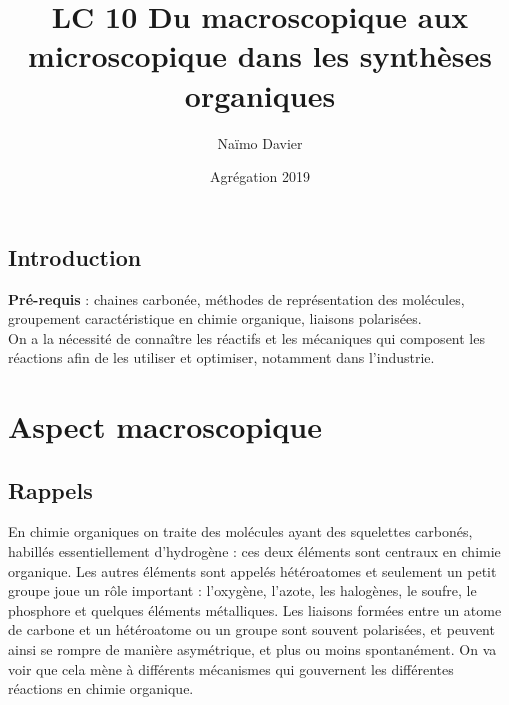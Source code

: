 \documentclass[12pt,prb,aps,epsf]{article}
\begin{document}
	
	\title{LC 10 Du macroscopique aux microscopique dans les synthèses organiques}
	\author{Naïmo Davier}
	\date{Agrégation 2019}
	
	\maketitle
	
	\tableofcontents
	
	\pagebreak
	
\subsection{Introduction}
	\textbf{Pré-requis} : chaines carbonée, méthodes de représentation des molécules, groupement caractéristique en chimie organique, liaisons polarisées.\\
	
	On a la nécessité de connaître les réactifs et les mécaniques qui composent les réactions afin de les utiliser et optimiser, notamment dans l'industrie.
	
\section{Aspect macroscopique}


\subsection{Rappels}
En chimie organiques on traite des molécules ayant des squelettes carbonés, habillés essentiellement d'hydrogène : ces deux éléments sont centraux en chimie organique. Les autres éléments sont appelés hétéroatomes et seulement un petit groupe joue un rôle important : l'oxygène, l'azote, les halogènes, le soufre, le phosphore et quelques éléments métalliques. Les liaisons formées entre un atome de carbone et un hétéroatome ou un groupe sont souvent polarisées, et peuvent ainsi se rompre de manière asymétrique, et plus ou moins spontanément. On va voir que cela mène à différents mécanismes qui gouvernent les différentes réactions en chimie organique.
\end{document}

